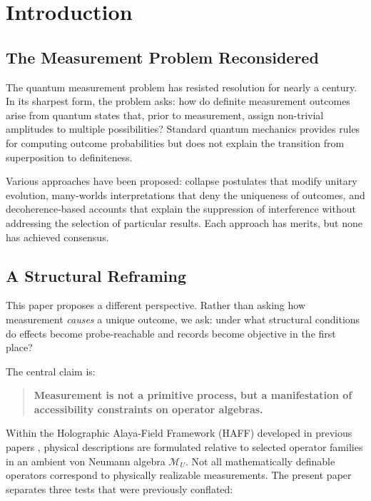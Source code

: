 \documentclass[12pt,a4paper,openany]{book}
\begin{document}
\section{Introduction}
\label{H-E-sec:intro}

\subsection{The Measurement Problem Reconsidered}

The quantum measurement problem has resisted resolution for nearly a century. In its sharpest form, the problem asks: how do definite measurement outcomes arise from quantum states that, prior to measurement, assign non-trivial amplitudes to multiple possibilities? Standard quantum mechanics provides rules for computing outcome probabilities but does not explain the transition from superposition to definiteness.

Various approaches have been proposed: collapse postulates that modify unitary evolution, many-worlds interpretations that deny the uniqueness of outcomes, and decoherence-based accounts that explain the suppression of interference without addressing the selection of particular results. Each approach has merits, but none has achieved consensus.

\subsection{A Structural Reframing}

This paper proposes a different perspective. Rather than asking how measurement \emph{causes} a unique outcome, we ask: under what structural conditions do effects become probe-reachable and records become objective in the first place?

The central claim is:

\begin{quote}
\textbf{Measurement is not a primitive process, but a manifestation of accessibility constraints on operator algebras.}
\end{quote}

Within the Holographic Alaya-Field Framework (HAFF) developed in previous papers \cite{Liu2026PaperA,Liu2026PaperB,Liu2026PaperC,Liu2026PaperD}, physical descriptions are formulated relative to selected operator families in an ambient von Neumann algebra $\mathcal M_U$. Not all mathematically definable operators correspond to physically realizable measurements. The present paper separates three tests that were previously conflated:
\end{document}
